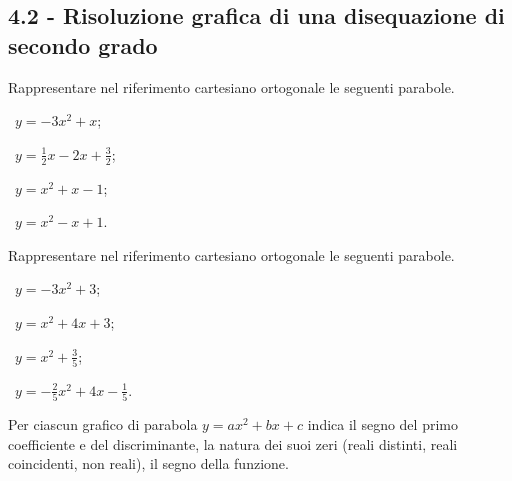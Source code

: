 \subsection*{4.2 - Risoluzione grafica di una disequazione di secondo grado}

\begin{esercizio}
 \label{ese:4.6}
Rappresentare nel riferimento cartesiano ortogonale le seguenti parabole.
\begin{multicols}{2}
 \begin{enumeratea}
 \item~$ y=-3x^2+x $;
 \item~$ y=\frac 1 2x-2x+\frac 3 2 $;
 \item~$ y=x^2+x-1 $;
 \item~$ y=x^2-x+1 $.
 \end{enumeratea}
 \end{multicols}
\end{esercizio}

\begin{esercizio}
 \label{ese:4.7}
Rappresentare nel riferimento cartesiano ortogonale le seguenti parabole.
\begin{multicols}{2}
 \begin{enumeratea}
 \item~$ y=-3x^2+3 $;
 \item~$ y=x^2+4x+3 $;
 \item~$ y=x^2+\frac 3 5 $;
 \item~$ y=-\frac 2 5x^2+4x-\frac 1 5 $.
 \end{enumeratea}
 \end{multicols}
\end{esercizio}

\begin{esercizio}
 \label{ese:4.8}
Per ciascun grafico di parabola $y=ax^2+bx+c$ indica il segno del primo coefficiente e del discriminante, la natura dei suoi zeri (reali distinti, reali coincidenti, non reali), il segno della funzione.
\begin{center}
 
\end{center}
\end{esercizio}

